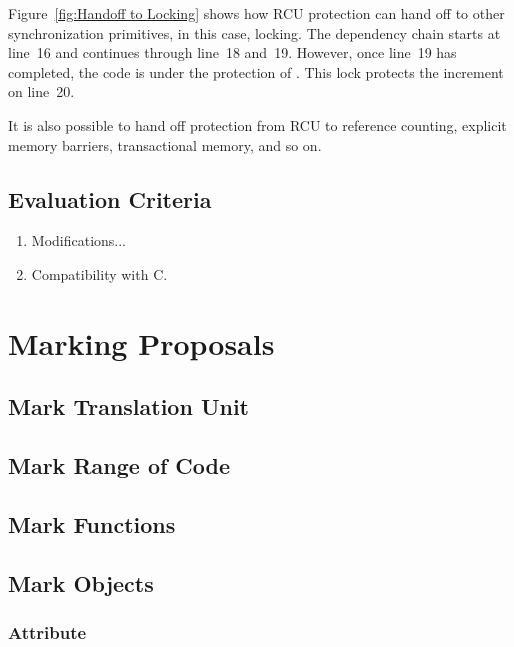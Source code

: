 \documentclass[letterpaper,twocolumn,10pt]{article}
\begin{document}
Figure~\ref{fig:Handoff to Locking}
shows how RCU protection can hand off to other synchronization
primitives, in this case, locking.
The dependency chain starts at line~16 and continues through line~18
and~19.
However, once line~19 has completed, the code is under the protection
of .
This lock protects the increment on line~20.

It is also possible to hand off protection from RCU to reference counting,
explicit memory barriers, transactional memory, and so on.

\subsection{Evaluation Criteria}
\label{sec:Evaluation Criteria}

\begin{enumerate}
\item	Modifications...
\item	Compatibility with C.
\end{enumerate}

\section{Marking Proposals}
\label{sec:Marking Proposals}

\subsection{Mark Translation Unit}
\label{sec:Mark Translation Unit}

\subsection{Mark Range of Code}
\label{sec:Mark Range of Code}

\subsection{Mark Functions}
\label{sec:Mark Functions}

\subsection{Mark Objects}
\label{sec:Mark Objects}

\subsubsection{Attribute}
\label{sec:Attribute}
\end{document}
